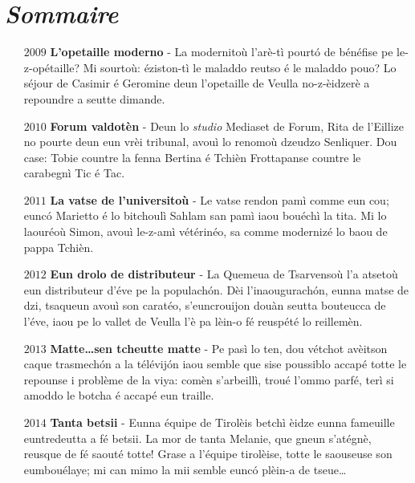 \chapter*{\textit{Sommaire}}
\begin{itemize}
\item[$2009$] \textbf{L'opetaille moderno} - La modernitoù l'arè-tì pourt\'o de bénéfise pe le-z-opétaille? Mi sourtoù: éziston-tì le maladdo reutso é le maladdo pouo? Lo séjour de Casimir é Geromine deun l'opetaille de Veulla no-z-èidzerè a repoundre a seutte dimande.\newline
\item[$2010$] \textbf{Forum valdotèn} - Deun lo \textit{studio} Mediaset de Forum, Rita de l'Eillize no pourte deun eun vrèi tribunal, avouì lo renomoù dzeudzo Senliquer. Dou case: Tobie countre la fenna Bertina é Tchièn Frottapanse countre le carabegnì Tic é Tac.\newline

\item[$2011$] \textbf{La vatse de l'universitoù} - Le vatse rendon pamì com\-me eun cou; eunc\'o Marietto é lo bitchoulì Sahlam san pamì iaou bouéchì la tita. Mi lo laouréoù Simon, avouì le-z-amì vétérinéo, sa comme modernizé lo baou de pappa Tchièn. \newline

\item[$2012$] \textbf{Eun drolo de distributeur} - La Quemeua de Tsarvensoù l'a atsetoù eun distributeur d'éve pe la populach\'on. Dèi l'inaougurach\'on, eunna matse de dzi, tsaqueun avouì son caratéo, s'euncrouijon douàn seutta bouteucca de l'éve, iaou pe lo vallet de Veulla l'è pa lèin-o fé reuspété lo reillemèn.
\newline

\item[$2013$] \textbf{Matte\ldots sen tcheutte matte} - Pe pasì lo ten, dou vé\-tchot avèitson caque trasmech\'on a la télévij\'on iaou sem\-ble que sise poussiblo accapé totte le repounse i problème de la viya: comèn s'arbeillì, troué l'ommo parfé, terì si amoddo le bo\-tcha é accapé eun traille.\newline

\item[$2014$] \textbf{Tanta betsii} - Eunna équipe de Tirolèis betchì èidze eunna fameuille euntredeutta a fé betsii. La mor de tanta Melanie, que gneun s'atégnè, reusque de fé saouté totte! Grase a l'équipe tirolèise, totte le saouseuse son eumbouélaye; mi can mimo la mii semble eunc\'o plèin-a de tseue\ldots\newline


\end{itemize}

